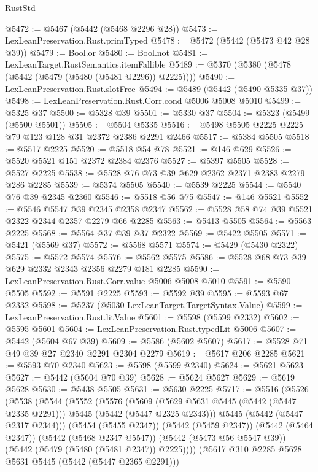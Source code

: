 \begin{lexlean}{RustStd}
\begin{coremodule}
@5472 := @5467 (@5442 (@5468 @2296 @28))
@5473 := LexLeanPreservation.Rust.primTyped
@5478 := @5472 (@5442 (@5473 @42 @28 @39))
@5479 := Bool.or
@5480 := Bool.not
@5481 := LexLeanTarget.RustSemantics.itemFallible
@5489 := @5370 (@5380 (@5478 (@5442 (@5479 (@5480 (@5481 @2296)) @2225))))
@5490 := LexLeanPreservation.Rust.slotFree
@5494 := @5489 (@5442 (@5490 @5335 @37))
@5498 := LexLeanPreservation.Rust.Corr.cond @5006 @5008 @5010
@5499 := @5325 @37
@5500 := @5328 @39
@5501 := @5330 @37
@5504 := @5323 (@5499 (@5500 @5501))
@5505 := @5504 @5335
@5516 := @5498 @5505 @2225 @2225 @79 @123 @128 @31 @2372 @2386 @2291 @2466
@5517 := @5384 @5505
@5518 := @5517 @2225
@5520 := @5518 @54 @78
@5521 := @146 @629
@5526 := @5520 @5521 @151 @2372 @2384 @2376
@5527 := @5397 @5505
@5528 := @5527 @2225
@5538 := @5528 @76 @73 @39 @629 @2362 @2371 @2383 @2279 @286 @2285
@5539 := @5374 @5505
@5540 := @5539 @2225
@5544 := @5540 @76 @39 @2345 @2360
@5546 := @5518 @56 @75
@5547 := @146 @5521
@5552 := @5546 @5547 @39 @2345 @2358 @2347
@5562 := @5528 @58 @74 @39 @5521 @2322 @2344 @2357 @2279 @66 @2285
@5563 := @5413 @5505
@5564 := @5563 @2225
@5568 := @5564 @37 @39 @37 @2322
@5569 := @5422 @5505
@5571 := @5421 (@5569 @37)
@5572 := @5568 @5571
@5574 := @5429 (@5430 @2322)
@5575 := @5572 @5574
@5576 := @5562 @5575
@5586 := @5528 @68 @73 @39 @629 @2332 @2343 @2356 @2279 @181 @2285
@5590 := LexLeanPreservation.Rust.Corr.value @5006 @5008 @5010
@5591 := @5590 @5505
@5592 := @5591 @2225
@5593 := @5592 @39
@5595 := @5593 @67 @2332
@5598 := @5237 (@5030 LexLeanTarget.TargetSyntax.Value)
@5599 := LexLeanPreservation.Rust.litValue
@5601 := @5598 (@5599 @2332)
@5602 := @5595 @5601
@5604 := LexLeanPreservation.Rust.typedLit @5006
@5607 := @5442 (@5604 @67 @39)
@5609 := @5586 (@5602 @5607)
@5617 := @5528 @71 @49 @39 @27 @2340 @2291 @2304 @2279
@5619 := @5617 @206 @2285
@5621 := @5593 @70 @2340
@5623 := @5598 (@5599 @2340)
@5624 := @5621 @5623
@5627 := @5442 (@5604 @70 @39)
@5628 := @5624 @5627
@5629 := @5619 @5628
@5630 := @5438 @5505
@5631 := @5630 @2225
@5717 := @5516
    (@5526
      (@5538
        (@5544
          (@5552
            (@5576
              (@5609
                (@5629 @5631 @5445 (@5442 (@5447 @2335 @2291)))
                @5445
                (@5442 (@5447 @2325 @2343)))
              @5445
              (@5442 (@5447 @2317 @2344)))
            (@5454 (@5455 @2347))
            (@5442 (@5459 @2347))
            (@5442 (@5464 @2347))
            (@5442 (@5468 @2347 @5547))
            (@5442 (@5473 @56 @5547 @39))
            (@5442 (@5479 (@5480 (@5481 @2347)) @2225))))
        (@5617 @310 @2285 @5628 @5631 @5445 (@5442 (@5447 @2365 @2291)))

\end{coremodule}
\end{lexlean}
